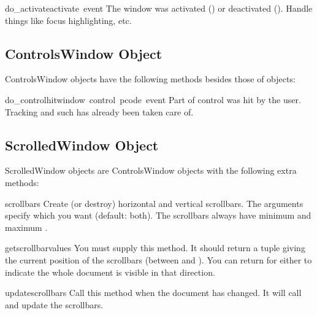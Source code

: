 \begin{funcdesc}{do_activate}{activate\, event}
The window was activated () or deactivated
(). Handle things like focus highlighting, etc.
\end{funcdesc}

\subsection{ControlsWindow Object}

ControlsWindow objects have the following methods besides those of
 objects:

\renewcommand{\indexsubitem}{(ControlsWindow method)}

\begin{funcdesc}{do_controlhit}{window\, control\, pcode\, event}
Part  of control  was hit by the
user. Tracking and such has already been taken care of.
\end{funcdesc}

\subsection{ScrolledWindow Object}

ScrolledWindow objects are ControlsWindow objects with the following
extra methods:

\renewcommand{\indexsubitem}{(ScrolledWindow method)}

\begin{funcdesc}{scrollbars}{}
Create (or destroy) horizontal and vertical scrollbars. The arguments
specify which you want (default: both). The scrollbars always have
minimum  and maximum .
\end{funcdesc}

\begin{funcdesc}{getscrollbarvalues}{}
You must supply this method. It should return a tuple 
giving the current position of the scrollbars (between  and
). You can return  for either to indicate the
whole document is visible in that direction.
\end{funcdesc}

\begin{funcdesc}{updatescrollbars}{}
Call this method when the document has changed. It will call
 and update the scrollbars.
\end{funcdesc}

